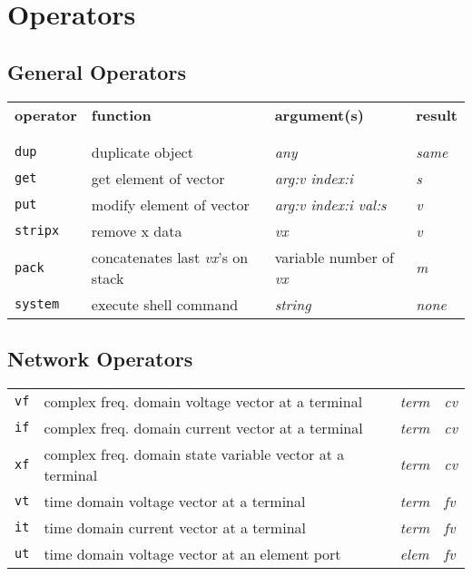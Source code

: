 \clearpage

\section{Operators}


\subsection{General Operators}

\begin{tabular}{p{.8in}p{2.5in}p{1.0in}p{.75in}}
{\bf operator} & {\bf function} & {\bf argument(s)} & {\bf result} \\
\\
\\
{\tt dup} & duplicate object & {\it any} & {\it same} \\
{\tt get} & get element of vector & {\it arg:v \newline index:i} & {\it s} \\
{\tt put} & modify element of vector & {\it arg:v \newline index:i \newline
  val:s} & {\it v} \\
{\tt stripx} & remove x data & {\it vx} & {\it v} \\
{\tt pack} & concatenates last {\it vx}'s on stack & variable number of {\it vx} & {\it m} \\
{\tt system} & execute shell command & {\it string} & {\it none}
\end{tabular}

\subsection{Network Operators}

\begin{tabular}{p{.8in}p{2.5in}p{1.0in}p{.75in}}
{\tt vf} & complex freq. domain voltage vector at a terminal &
    {\it term} & {\it cv} \\
{\tt if} & complex freq. domain current vector at a terminal &
    {\it term} & {\it cv} \\
{\tt xf} & complex freq. domain state variable vector at a terminal &
    {\it term} & {\it cv} \\
{\tt vt} & time domain voltage vector at a terminal &
    {\it term} & {\it fv} \\
{\tt it} & time domain current vector at a terminal &
    {\it term} & {\it fv} \\
{\tt ut} & time domain voltage vector at an element port &
    {\it elem} & {\it fv} \\
\end{tabular}

